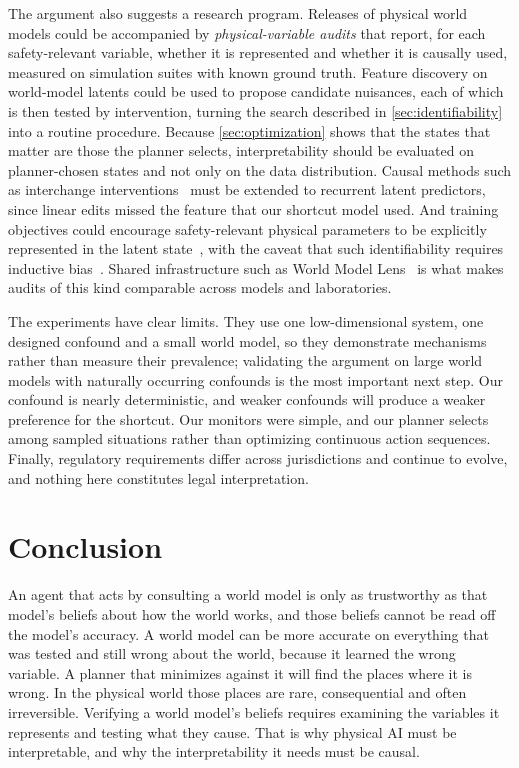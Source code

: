 \documentclass[11pt]{article}
\theoremstyle{definition}\newtheorem{definition}{Definition}
\begin{document}
The argument also suggests a research program. Releases of physical world models could be accompanied by \emph{physical-variable audits} that report, for each safety-relevant variable, whether it is represented and whether it is causally used, measured on simulation suites with known ground truth. Feature discovery on world-model latents could be used to propose candidate nuisances, each of which is then tested by intervention, turning the search described in \cref{sec:identifiability} into a routine procedure. Because \cref{sec:optimization} shows that the states that matter are those the planner selects, interpretability should be evaluated on planner-chosen states and not only on the data distribution. Causal methods such as interchange interventions~\citep{geiger2021causal} must be extended to recurrent latent predictors, since linear edits missed the feature that our shortcut model used. And training objectives could encourage safety-relevant physical parameters to be explicitly represented in the latent state~\citep{bengio2013representation,scholkopf2021causal}, with the caveat that such identifiability requires inductive bias~\citep{locatello2019challenging}. Shared infrastructure such as World Model Lens~\citep{worldmodellens} is what makes audits of this kind comparable across models and laboratories.

The experiments have clear limits. They use one low-dimensional system, one designed confound and a small world model, so they demonstrate mechanisms rather than measure their prevalence; validating the argument on large world models with naturally occurring confounds is the most important next step. Our confound is nearly deterministic, and weaker confounds will produce a weaker preference for the shortcut. Our monitors were simple, and our planner selects among sampled situations rather than optimizing continuous action sequences. Finally, regulatory requirements differ across jurisdictions and continue to evolve, and nothing here constitutes legal interpretation.

\section{Conclusion}
An agent that acts by consulting a world model is only as trustworthy as that model's beliefs about how the world works, and those beliefs cannot be read off the model's accuracy. A world model can be more accurate on everything that was tested and still wrong about the world, because it learned the wrong variable. A planner that minimizes against it will find the places where it is wrong. In the physical world those places are rare, consequential and often irreversible. Verifying a world model's beliefs requires examining the variables it represents and testing what they cause. That is why physical AI must be interpretable, and why the interpretability it needs must be causal.
\end{document}
